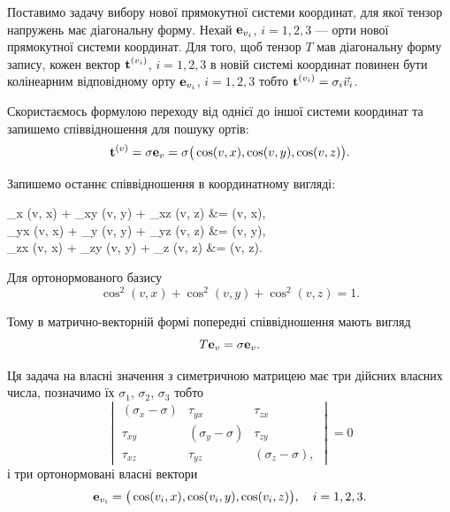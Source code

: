 Поставимо задачу вибору нової прямокутної системи координат, для якої тензор напружень має діагональну форму. Нехай $\bf{e}_{v_i}$, $i = 1, 2, 3$ --- орти нової прямокутної системи координат. Для того, щоб тензор $T$ мав діагональну форму запису, кожен вектор $\bf{t}^{(v_i)}$, $i = 1, 2, 3$ в новій системі координат повинен бути колінеарним відповідному орту $\bf{e}_{v_i}$, $i = 1, 2, 3$ тобто $\bf{t}^{(v_i)} = \sigma_i \vec v_i$. \medskip

Скористаємось формулою переходу від однієї до іншої системи координат та запишемо співвідношення для пошуку ортів:
\begin{equation}
	\bf{t}^{(v)} = \sigma \bf{e}_v = \sigma \big( \cos(v, x), \cos (v, y), \cos (v, z) \big).
\end{equation}

Запишемо останнє співвідношення в координатному вигляді:
\begin{system}
	\sigma_x \cos(v, x) + \tau_{xy} \cos(v, y) + \tau_{xz} \cos(v, z) &= \sigma \cos(v, x), \\
	\tau_{yx} \cos(v, x) + \sigma_y \cos(v, y) + \tau_{yz} \cos(v, z) &= \sigma \cos(v, y), \\
	\tau_{zx} \cos(v, x) + \tau_{zy} \cos(v, y) + \sigma_z \cos(v, z) &= \sigma \cos(v, z).
\end{system}

Для ортонормованого базису
\begin{equation}
	\cos^2(v, x) + \cos^2(v, y) + \cos^2(v, z) = 1.
\end{equation}

Тому в матрично-векторній формі попередні співвідношення мають вигляд
\begin{equation}
	T \bf{e}_v = \sigma \bf{e}_v.	
\end{equation}

Ця задача на власні значення з симетричною матрицею має три дійсних власних числа, позначимо їх $\sigma_1$, $\sigma_2$, $\sigma_3$ тобто 
\begin{equation}
	\begin{vmatrix}
		(\sigma_x - \sigma) & \tau_{y x} & \tau_{z x} \\
		\tau_{x y} & (\sigma_y - \sigma) & \tau_{z y} \\
		\tau_{x z} & \tau_{y z} & (\sigma_z - \sigma),
	\end{vmatrix} = 0
\end{equation}
і три ортонормовані власні вектори
\begin{equation}
	\bf{e}_{v_i} = \big( \cos(v_i, x), \cos(v_i, y), \cos(v_i, z) \big), \quad i = 1, 2, 3.
\end{equation}


